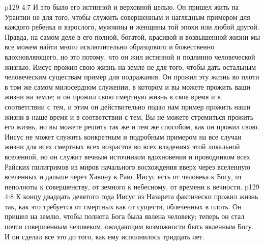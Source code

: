 \vs p129 4:7 И это было его истинной и верховной целью. Он пришел жить на Урантии не для того, чтобы служить совершенным и наглядным примером для каждого ребенка и взрослого, мужчины и женщины той эпохи или любой другой. Правда, на самом деле в его полной, богатой, красивой и возвышенной жизни мы все можем найти много исключительно образцового и божественно вдохновляющего, но это потому, что он жил истинной и подлинно человеческой жизнью. Иисус прожил свою жизнь на земле не для того, чтобы дать остальным человеческим существам пример для подражания. Он прожил эту жизнь во плоти в том же самом милосердном служении, в котором и вы можете прожить ваши жизни на земле; и он прожил свою смертную жизнь в свое время и в соответствии с тем,  и этим он действительно подал нам пример прожить наши жизни в наше время и в соответствии с тем,  Вы не можете стремиться прожить его жизнь, но вы можете решить  так же и тем же способом, как он прожил свою. Иисус не может служить конкретным и подробным примером на все случаи жизни для всех смертных всех возрастов во всех владениях этой локальной вселенной, но он служит вечным источником вдохновения и проводником всех Райских пилигримов из миров начального восхождения вверх через вселенную вселенных и дальше через Хавону к Раю. Иисус есть  от человека к Богу, от неполноты к совершенству, от земного к небесному, от времени к вечности.
\vs p129 4:8 \pc К концу двадцать девятого года Иисус из Назарета фактически прожил жизнь так, как это требуется от смертных как от существ, облеченных в плоть. Он пришел на землю, чтобы полнота Бога была явлена человеку; теперь он стал почти совершенным человеком, ожидающим возможности быть явленным Богу. И он сделал все это до того, как ему исполнилось тридцать лет.
